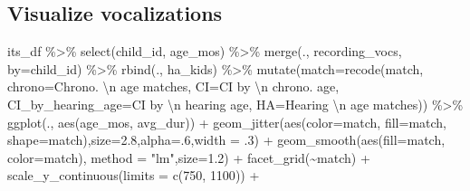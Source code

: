 \documentclass[
]{article}
\newenvironment{Shaded}{\begin{snugshade}}{\end{snugshade}}
\newcommand{\AttributeTok}[1]{\textcolor[rgb]{0.77,0.63,0.00}{#1}}
\newcommand{\DecValTok}[1]{\textcolor[rgb]{0.00,0.00,0.81}{#1}}
\newcommand{\FloatTok}[1]{\textcolor[rgb]{0.00,0.00,0.81}{#1}}
\newcommand{\FunctionTok}[1]{\textcolor[rgb]{0.00,0.00,0.00}{#1}}
\newcommand{\NormalTok}[1]{#1}
\newcommand{\SpecialCharTok}[1]{\textcolor[rgb]{0.00,0.00,0.00}{#1}}
\newcommand{\StringTok}[1]{\textcolor[rgb]{0.31,0.60,0.02}{#1}}
\begin{document}
\hypertarget{visualize-vocalizations}{%
\subsection{Visualize vocalizations}\label{visualize-vocalizations}}

\begin{Shaded}
\begin{Highlighting}[]
\NormalTok{its\_df }\SpecialCharTok{\%\textgreater{}\%}
  \FunctionTok{select}\NormalTok{(child\_id, age\_mos) }\SpecialCharTok{\%\textgreater{}\%}
  \FunctionTok{merge}\NormalTok{(., recording\_vocs, }\AttributeTok{by=}\StringTok{\textquotesingle{}child\_id\textquotesingle{}}\NormalTok{) }\SpecialCharTok{\%\textgreater{}\%}
  \FunctionTok{rbind}\NormalTok{(., ha\_kids) }\SpecialCharTok{\%\textgreater{}\%}
\FunctionTok{mutate}\NormalTok{(}\AttributeTok{match=}\FunctionTok{recode}\NormalTok{(match,}
                      \AttributeTok{chrono=}\StringTok{\textquotesingle{}Chrono. }\SpecialCharTok{\textbackslash{}n}\StringTok{ age matches\textquotesingle{}}\NormalTok{,}
                      \AttributeTok{CI=}\StringTok{\textquotesingle{}CI by }\SpecialCharTok{\textbackslash{}n}\StringTok{ chrono. age\textquotesingle{}}\NormalTok{,}
                      \AttributeTok{CI\_by\_hearing\_age=}\StringTok{\textquotesingle{}CI by }\SpecialCharTok{\textbackslash{}n}\StringTok{ hearing age\textquotesingle{}}\NormalTok{,}
                      \AttributeTok{HA=}\StringTok{\textquotesingle{}Hearing }\SpecialCharTok{\textbackslash{}n}\StringTok{ age matches\textquotesingle{}}\NormalTok{)) }\SpecialCharTok{\%\textgreater{}\%}
\FunctionTok{ggplot}\NormalTok{(., }\FunctionTok{aes}\NormalTok{(age\_mos, avg\_dur)) }\SpecialCharTok{+}
  \FunctionTok{geom\_jitter}\NormalTok{(}\FunctionTok{aes}\NormalTok{(}\AttributeTok{color=}\NormalTok{match, }\AttributeTok{fill=}\NormalTok{match, }\AttributeTok{shape=}\NormalTok{match),}\AttributeTok{size=}\FloatTok{2.8}\NormalTok{,}\AttributeTok{alpha=}\NormalTok{.}\DecValTok{6}\NormalTok{,}\AttributeTok{width =}\NormalTok{ .}\DecValTok{3}\NormalTok{) }\SpecialCharTok{+}
  \FunctionTok{geom\_smooth}\NormalTok{(}\FunctionTok{aes}\NormalTok{(}\AttributeTok{fill=}\NormalTok{match, }\AttributeTok{color=}\NormalTok{match), }\AttributeTok{method =} \StringTok{"lm"}\NormalTok{,}\AttributeTok{size=}\FloatTok{1.2}\NormalTok{) }\SpecialCharTok{+}
  \FunctionTok{facet\_grid}\NormalTok{(}\SpecialCharTok{\textasciitilde{}}\NormalTok{match) }\SpecialCharTok{+}
  \FunctionTok{scale\_y\_continuous}\NormalTok{(}\AttributeTok{limits =} \FunctionTok{c}\NormalTok{(}\DecValTok{750}\NormalTok{, }\DecValTok{1100}\NormalTok{)) }\SpecialCharTok{+}

\end{Highlighting}
\end{Shaded}
\end{document}
